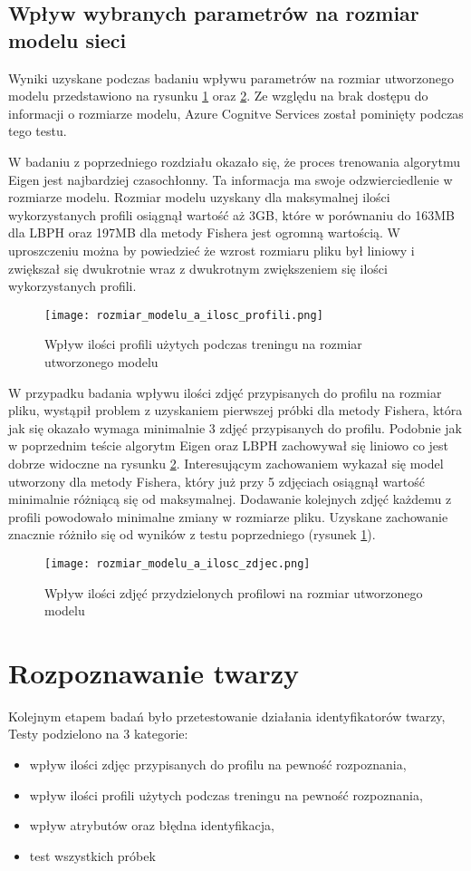 \subsection{Wpływ wybranych parametrów na rozmiar modelu sieci}
Wyniki uzyskane podczas badaniu wpływu parametrów na rozmiar utworzonego modelu przedstawiono na rysunku \ref{fig:rozmiar_profile} oraz \ref{fig:rozmiar_zdjecia}. Ze względu na brak dostępu do informacji o rozmiarze modelu, Azure Cognitve Services został pominięty podczas tego testu.

W badaniu z poprzedniego rozdziału okazało się, że proces trenowania algorytmu Eigen jest najbardziej czasochłonny. Ta informacja ma swoje odzwierciedlenie w rozmiarze modelu. Rozmiar modelu uzyskany dla maksymalnej ilości wykorzystanych profili osiągnął wartość aż 3GB, które w porównaniu do 163MB dla LBPH oraz 197MB dla metody Fishera jest ogromną wartością. W uproszczeniu można by powiedzieć że wzrost rozmiaru pliku był liniowy i zwiększał się dwukrotnie wraz z dwukrotnym zwiększeniem się ilości wykorzystanych profili. 
\begin{figure}[H]
	\centering
	\texttt{[image: rozmiar\_modelu\_a\_ilosc\_profili.png]}
	\caption{Wpływ ilości profili użytych podczas treningu na rozmiar utworzonego modelu}
	\label{fig:rozmiar_profile}
\end{figure}
W przypadku badania wpływu ilości zdjęć przypisanych do profilu na rozmiar pliku, wystąpił problem z uzyskaniem pierwszej próbki dla metody Fishera, która jak się okazało wymaga minimalnie 3 zdjęć przypisanych do profilu. Podobnie jak w poprzednim teście algorytm Eigen oraz LBPH zachowywał się liniowo co jest dobrze widoczne na rysunku \ref{fig:rozmiar_zdjecia}. Interesującym zachowaniem wykazał się model utworzony dla metody Fishera, który już przy 5 zdjęciach osiągnął wartość minimalnie różniącą się od maksymalnej. Dodawanie kolejnych zdjęć każdemu z profili powodowało minimalne zmiany w rozmiarze pliku. Uzyskane zachowanie znacznie różniło się od wyników z testu poprzedniego (rysunek \ref{fig:rozmiar_profile}).
\begin{figure}[H]
	\centering
	\texttt{[image: rozmiar\_modelu\_a\_ilosc\_zdjec.png]}
	\caption{Wpływ ilości zdjęć przydzielonych profilowi na rozmiar utworzonego modelu}
	\label{fig:rozmiar_zdjecia}
\end{figure}

\section{Rozpoznawanie twarzy} \label{b:rozpoznawanie}
Kolejnym etapem badań było przetestowanie działania identyfikatorów twarzy, Testy podzielono na 3 kategorie:
\begin{itemize}
\item wpływ ilości zdjęc przypisanych do profilu na pewność rozpoznania,
\item wpływ ilości profili użytych podczas treningu na pewność rozpoznania,
\item wpływ atrybutów oraz błędna identyfikacja,
\item test wszystkich próbek
\end{itemize}
